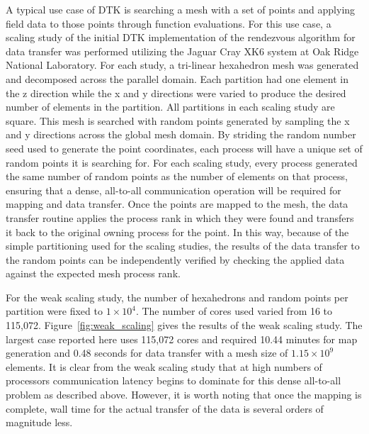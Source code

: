 \documentclass{mc2013}
\begin{document}
\label{subsec:cfd_neutronics}


\label{sec:scaling_study}

A typical use case of DTK is searching a mesh with a set of points and
applying field data to those points through function evaluations. For
this use case, a scaling study of the initial DTK implementation of
the rendezvous algorithm for data transfer was performed utilizing the
Jaguar Cray XK6 system at Oak Ridge National Laboratory. For each
study, a tri-linear hexahedron mesh was generated and decomposed
across the parallel domain. Each partition had one element in the z
direction while the x and y directions were varied to produce the
desired number of elements in the partition. All partitions in each
scaling study are square. This mesh is searched with random points
generated by sampling the x and y directions across the global mesh
domain.  By striding the random number seed used to generate the point
coordinates, each process will have a unique set of random points it
is searching for. For each scaling study, every process generated the
same number of random points as the number of elements on that
process, ensuring that a dense, all-to-all communication operation
will be required for mapping and data transfer. Once the points are
mapped to the mesh, the data transfer routine applies the process rank
in which they were found and transfers it back to the original owning
process for the point. In this way, because of the simple partitioning
used for the scaling studies, the results of the data transfer to the
random points can be independently verified by checking the applied
data against the expected mesh process rank.

\label{subsec:weak_scaling}
For the weak scaling study, the number of hexahedrons and random
points per partition were fixed to $1 \times 10^4$. The number of
cores used varied from 16 to 115,072. Figure~\ref{fig:weak_scaling}
gives the results of the weak scaling study. The largest case reported
here uses 115,072 cores and required 10.44 minutes for map generation
and 0.48 seconds for data transfer with a mesh size of $1.15 \times
10^9$ elements. It is clear from the weak scaling study that at high
numbers of processors communication latency begins to dominate for
this dense all-to-all problem as described above. However, it is worth
noting that once the mapping is complete, wall time for the actual
transfer of the data is several orders of magnitude less.
\end{document}
